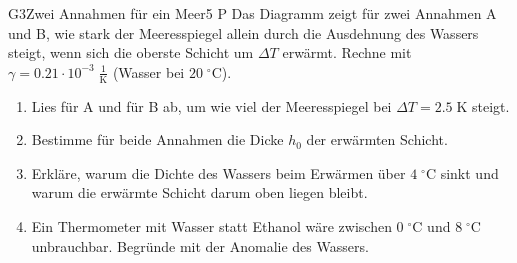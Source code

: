 \documentclass[11pt]{article}
\begin{document}
\begin{lpaufgabe}{G3}{Zwei Annahmen für ein Meer}{5 P}
Das Diagramm zeigt für zwei Annahmen A und B, wie stark der Meeresspiegel allein durch die Ausdehnung des Wassers steigt, wenn sich die oberste Schicht um \(\Delta T\) erwärmt. Rechne mit \(\gamma = 0.21 \cdot 10^{-3}\;\tfrac{1}{\text{K}}\) (Wasser bei \(20\;^\circ\text{C}\)).\par\smallskip
\begin{center}\end{center}
\begin{enumerate}[label=\alph*),leftmargin=*,itemsep=2pt,topsep=2pt]
\item Lies für A und für B ab, um wie viel der Meeresspiegel bei \(\Delta T = 2.5\;\text{K}\) steigt.
\item Bestimme für beide Annahmen die Dicke \(h_0\) der erwärmten Schicht.
\item Erkläre, warum die Dichte des Wassers beim Erwärmen über \(4\;^\circ\text{C}\) sinkt und warum die erwärmte Schicht darum oben liegen bleibt.
\item Ein Thermometer mit Wasser statt Ethanol wäre zwischen \(0\;^\circ\text{C}\) und \(8\;^\circ\text{C}\) unbrauchbar. Begründe mit der Anomalie des Wassers.
\end{enumerate}
\end{lpaufgabe}

\end{document}
